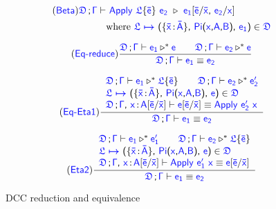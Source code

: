 \begin{figure}
\renewcommand{\arraystretch}{1.3}

	\begin{align*}
		\tag{\targettext{Beta}}
		\targetcon \vdash &\ \target{Apply\ } \target{\flabel}\{\target{\bar{e}}\}\ \target{e_2}\ \triangleright\  
		\target{e_1}[\target{\bar{e}} \slash \target{\bar{x}} \sfcomma \target{e_2} \slash \target{x}] \\
		& \text{where } \itemdef{\target{\flabel}}{\itemtype{\bar{x}}{\bar{A}}}{\targetpi{x}{A}{B}}{\target{e_1}} \in \target{\fdef}
	\end{align*}

	\begin{equation}
		\tag{\targettext{Eq-reduce}}
		\frac
			{\target{\fdef}\semicolon \target{\Gamma} \vdash \target{e_1} \triangleright^* \target{e} \qquad 
			 \target{\fdef}\semicolon \target{\Gamma} \vdash \target{e_2} \triangleright^* \target{e}}
			{\target{\fdef}\semicolon \target{\Gamma} \vdash \target{e_1} \equiv \target{e_2}}
	\end{equation}

	\begin{equation}
		\tag{\targettext{Eq-Eta1}}
		\frac
			{\begin{array}{l}
			  \target{\fdef}\semicolon \target{\Gamma} \vdash \target{e_1} \triangleright^* \targetlab{\flabel}{\bar{e}} \qquad
	          \target{\fdef}\semicolon \target{\Gamma} \vdash \target{e_2} \triangleright^* \target{e_2'} \\
	          \itemdef{\target{\flabel}}{\itemtype{\bar{x}}{\bar{A}}}{\targetpi{x}{A}{B}}{\target{e}} \in \target{\fdef} \\
	          \target{\fdef}\semicolon \target{\Gamma}\sfcomma \itemtype{x}{A} \targetsub{\bar{e}}{\bar{x}} \vdash 
	          \target{e}\targetsub{\bar{e}}{\bar{x}} \equiv \targetapp{e_2'}{x}
        	\end{array}}
			{\target{\fdef}\semicolon \target{\Gamma} \vdash \target{e_1} \equiv \target{e_2}}
	\end{equation}

	\begin{equation}
		\tag{\targettext{Eta2}}
		\frac
			{\begin{array}{l}
			  \target{\fdef}\semicolon \target{\Gamma} \vdash \target{e_1} \triangleright^* \target{e_1'} \qquad
	          \target{\fdef}\semicolon \target{\Gamma} \vdash \target{e_2} \triangleright^* \targetlab{\flabel}{\bar{e}} \\
	          \itemdef{\target{\flabel}}{\itemtype{\bar{x}}{\bar{A}}}{\targetpi{x}{A}{B}}{\target{e}} \in \target{\fdef} \\
	          \target{\fdef}\semicolon \target{\Gamma}\sfcomma \itemtype{x}{A} \targetsub{\bar{e}}{\bar{x}} \vdash 
	          \targetapp{e_1'}{x} \equiv \target{e}\targetsub{\bar{e}}{\bar{x}}
        	\end{array}}
			{\target{\fdef}\semicolon \target{\Gamma} \vdash \target{e_1} \equiv \target{e_2}}
	\end{equation}

	\caption{DCC reduction and equivalence}
    \label{fig:dcc equivalence}
\end{figure}

